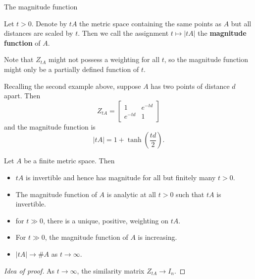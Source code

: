 \documentclass[12pt,mathserif]{beamer}
\begin{document}
\begin{frame}[allowframebreaks]{The magnitude function}

\begin{definition}
Let $t > 0$. Denote by $tA$ the metric space containing the same points as $A$ but all distances are scaled by $t$. Then we call the assignment $t\mapsto\vert tA\vert$ the \textbf{magnitude function} of $A$.
\end{definition}

Note that $Z_{tA}$ might not possess a weighting for all $t$, so the magnitude function might only be a partially defined function of $t$.

\framebreak

\begin{example}
Recalling the second example above, suppose $A$ has two points of distance $d$ apart. Then
\begin{equation*}
Z_{tA} = \begin{bmatrix} 1 & e^{-td} \\ e^{-td} & 1 \end{bmatrix}
\end{equation*}
and the magnitude function is
\begin{equation*}
\vert tA \vert = 1 + \tanh\left(\frac{td}{2}\right).
\end{equation*}
\end{example}

\begin{theorem}
Let $A$ be a finite metric space. Then
\begin{itemize}
\item $tA$ is invertible and hence has magnitude for all but finitely many $t > 0$.
\item The magnitude function of $A$ is analytic at all $t>0$ such that $tA$ is invertible.
\item for $t \gg 0$, there is a unique, positive, weighting on $tA$.
\item For $t \gg 0$, the magnitude function of $A$ is increasing.
\item $\vert tA \vert \to \#A$ as $t \to \infty$.
\end{itemize}
\end{theorem}

\begin{proof}[Idea of proof]\renewcommand{\qedsymbol}{}
As $t\to\infty$, the similarity matrix $Z_{tA} \to I_n$.
\end{proof}


\end{frame}
\end{document}
